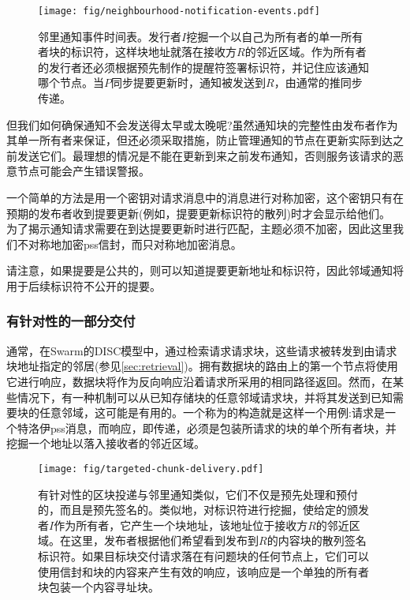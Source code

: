 \begin{figure}[htbp]
\centering
\texttt{[image: fig/neighbourhood-notification-events.pdf]}
\caption[事件的邻里通知时间表\statusgreen]{邻里通知事件时间表。发行者$I$挖掘一个以自己为所有者的单一所有者块的标识符，这样块地址就落在接收方$R$的邻近区域。作为所有者的发行者还必须根据预先制作的提醒符签署标识符，并记住应该通知哪个节点。当$P$同步提要更新时，通知被发送到$R$，由通常的推同步传递。}
\label{fig:neighbourhood-notification-events}
\end{figure}
  

但我们如何确保通知不会发送得太早或太晚呢?虽然通知块的完整性由发布者作为其单一所有者来保证，但还必须采取措施，防止管理通知的节点在更新实际到达之前发送它们。最理想的情况是不能在更新到来之前发布通知，否则服务该请求的恶意节点可能会产生错误警报。

一个简单的方法是用一个密钥对请求消息中的消息进行对称加密，这个密钥只有在预期的发布者收到提要更新(例如，提要更新标识符的散列)时才会显示给他们。
为了揭示通知请求需要在到达提要更新时进行匹配，主题必须不加密，因此这里我们不对称地加密pss信封，而只对称地加密消息。

请注意，如果提要是公共的，则可以知道提要更新地址和标识符，因此邻域通知将用于后续标识符不公开的提要。

\subsubsection{有针对性的一部分交付}

通常，在Swarm的DISC模型中，通过检索请求请求块，这些请求被转发到由请求块地址指定的邻居(参见\ref{sec:retrieval})。拥有数据块的路由上的第一个节点将使用它进行响应，数据块将作为反向响应沿着请求所采用的相同路径返回。然而，在某些情况下，有一种机制可以从已知存储块的任意邻域请求块，并将其发送到已知需要块的任意邻域，这可能是有用的。一个称为的构造就是这样一个用例:请求是一个特洛伊pss消息，而响应，即传递，必须是包装所请求的块的单个所有者块，并挖掘一个地址以落入接收者的邻近区域。  


\begin{figure}[htbp]
\centering
\texttt{[image: fig/targeted-chunk-delivery.pdf]}      
\caption[目标块交付\statusgreen]{有针对性的区块投递与邻里通知类似，它们不仅是预先处理和预付的，而且是预先签名的。类似地，对标识符进行挖掘，使给定的颁发者$I$作为所有者，它产生一个块地址，该地址位于接收方$R$的邻近区域。在这里，发布者根据他们希望看到发布到$R$的内容块的散列签名标识符。如果目标块交付请求落在有问题块的任何节点上，它们可以使用信封和块的内容来产生有效的响应，该响应是一个单独的所有者块包装一个内容寻址块。}
\label{fig:targeted-chunk-delivery}
\end{figure}

